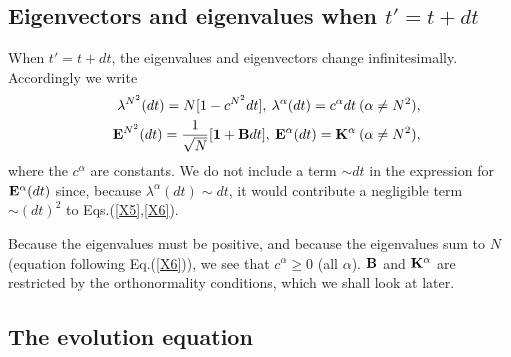 \documentclass[aps,pra,twocolumn,amssymb, amsfonts,amsmath,showpacs, superscriptaddress]{revtex4}
\begin{document}
\subsection{Eigenvectors and eigenvalues when $t'=t+dt$}
	
	  When $t'=t+dt$,  the eigenvalues and eigenvectors change infinitesimally.  Accordingly we write
\begin{eqnarray}\label{19}
 &&\lambda^{N^{2}}(dt)=N[1-c^{N^{2}}dt], \medspace \lambda ^{\alpha}(dt)=c^{\alpha}dt \medspace(\alpha\neq N^{2}),\nonumber\\
 &&{\bf E}^{N^{2}}(dt)=\frac{1}{\sqrt{N}}[{\bf1}+{\bf B}dt], \medspace {\bf E}^{\alpha}(dt)= {\bf K}^{\alpha} \medspace(\alpha\neq N^{2}),\nonumber\\
\end{eqnarray}
 \noindent where the $c^{\alpha}$ are constants. We do not  include a term $\sim dt$ in the expression for ${\bf E}^{\alpha}(dt)$ since, because $\lambda ^{\alpha}(dt)\sim dt$, it would 
 contribute a negligible term $\sim (dt)^{2}$ to  Eqs.(\ref{X5},\ref{X6}).
 
 Because the eigenvalues must be positive, and because the eigenvalues sum to $N$ (equation following Eq.(\ref{X6})), we see that $c^{\alpha}\geq0$ (all $\alpha$).  
  ${\bf B}$ and ${\bf K}^{\alpha}$ are restricted by the orthonormality conditions, which we shall look at later.
  
  \subsection{The evolution equation}
  
\end{document}
